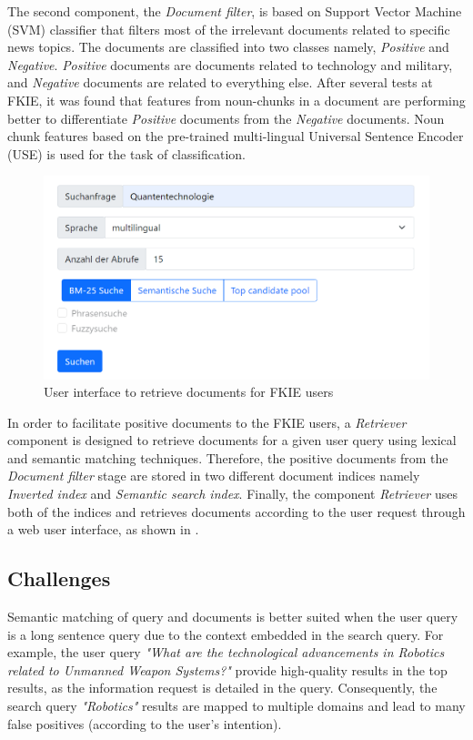 \documentclass[master,proposal,extern,palatino]{rgseThesis}
\begin{document}
The second component, the \textit{Document filter}, is based on Support Vector Machine (SVM) classifier that filters most of the irrelevant documents related to specific news topics. The documents are classified into two classes namely, \textit{Positive} and \textit{Negative}. \textit{Positive} documents are documents related to technology and military, and \textit{Negative} documents are related to everything else. After several tests at FKIE, it was found that features from noun-chunks in a document are performing better to differentiate \textit{Positive} documents from the \textit{Negative} documents. Noun chunk features based on the pre-trained multi-lingual Universal Sentence Encoder (USE) is used for the task of classification. 

\begin{figure}[h]
	\centering
	\includegraphics[width=.8\textwidth]{images/mitera_screenshots/newsfeeds_search.PNG}
	\caption{User interface to retrieve documents for FKIE users \label{fig:mitera_search}}
\end{figure}

In order to facilitate positive documents to the FKIE users, a \textit{Retriever} component is designed to retrieve documents for a given user query using lexical and semantic matching techniques.   Therefore, the positive documents from the \textit{Document filter} stage are stored in two different document indices namely \textit{Inverted index} and \textit{Semantic search index}. Finally, the component \textit{Retriever} uses both of the indices and retrieves documents according to the user request through a web user interface, as shown in .

 
\subsection{Challenges}

 Semantic matching of query and documents is better suited when the user query is a long sentence query due to the context embedded in the search query. For example, the user query \textit{"What are the technological advancements in Robotics related to Unmanned Weapon Systems?"} provide high-quality results in the top results, as the information request is detailed in the query. Consequently, the search query  \textit{"Robotics"} results are mapped to multiple domains and lead to many false positives (according to the user's intention). 
 
\end{document}

